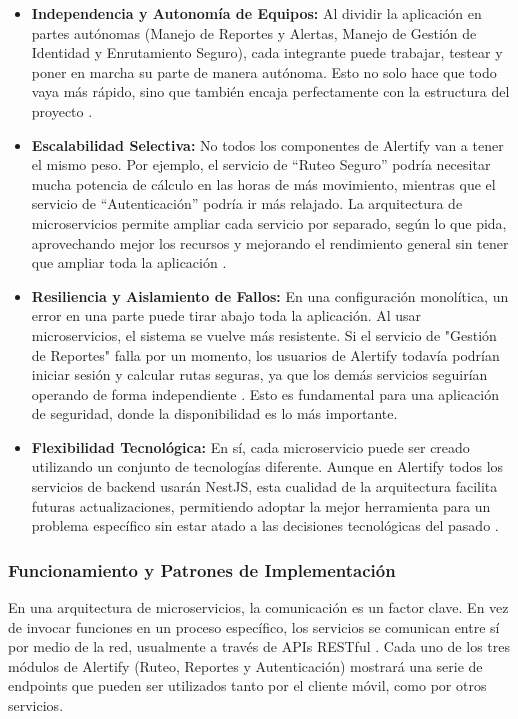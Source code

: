 \begin{itemize}
    \item \textbf{Independencia y Autonomía de Equipos: } Al dividir la aplicación en partes autónomas (Manejo de Reportes y Alertas, Manejo de Gestión de Identidad y Enrutamiento Seguro), cada integrante puede trabajar, testear y poner en marcha su parte de manera autónoma. Esto no solo hace que todo vaya más rápido, sino que también encaja perfectamente con la estructura del proyecto \cite{vural2017systematic}.
    \item \textbf{Escalabilidad Selectiva: }No todos los componentes de Alertify van a tener el mismo peso. Por ejemplo, el servicio de ``Ruteo Seguro'' podría necesitar mucha potencia de cálculo en las horas de más movimiento, mientras que el servicio de ``Autenticación'' podría ir más relajado. La arquitectura de microservicios permite ampliar cada servicio por separado, según lo que pida, aprovechando mejor los recursos y mejorando el rendimiento general sin tener que ampliar toda la aplicación \cite{blinowski2022monolithic}.
    \item \textbf{Resiliencia y Aislamiento de Fallos:} En una configuración monolítica, un error en una parte puede tirar abajo toda la aplicación. Al usar microservicios, el sistema se vuelve más resistente. Si el servicio de "Gestión de Reportes" falla por un momento, los usuarios de Alertify todavía podrían iniciar sesión y calcular rutas seguras, ya que los demás servicios seguirían operando de forma independiente \cite{newman2021building}. Esto es fundamental para una aplicación de seguridad, donde la disponibilidad es lo más importante.
    \item \textbf{Flexibilidad Tecnológica: }En sí, cada microservicio puede ser creado utilizando un conjunto de tecnologías diferente. Aunque en Alertify todos los servicios de backend usarán NestJS, esta cualidad de la arquitectura facilita futuras actualizaciones, permitiendo adoptar la mejor herramienta para un problema específico sin estar atado a las decisiones tecnológicas del pasado \cite{vural2017systematic}.
    
\end{itemize}
\subsubsection{Funcionamiento y Patrones de Implementación}
En una arquitectura de microservicios, la comunicación es un factor clave. En vez de invocar funciones en un proceso específico, los servicios se comunican entre sí por medio de la red, usualmente a través de APIs RESTful \cite{el2024exploring}.  Cada uno de los tres módulos de Alertify (Ruteo, Reportes y Autenticación) mostrará una serie de endpoints que pueden ser utilizados tanto por el cliente móvil, como por otros servicios.

